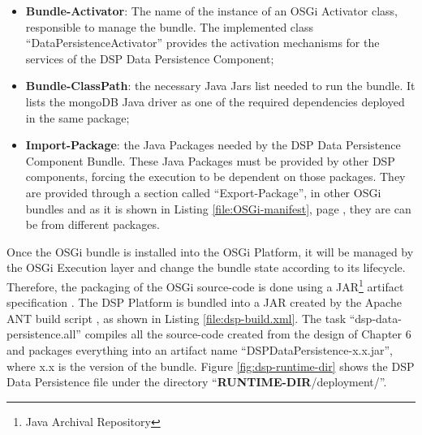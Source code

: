 \begin{itemize}
  \item \textbf{Bundle-Activator}: The name of the instance of an OSGi
  Activator class, responsible to manage the bundle. The implemented class
  ``DataPersistenceActivator'' provides the activation mechanisms for the
  services of the DSP Data Persistence Component;
  \item \textbf{Bundle-ClassPath}: the necessary Java Jars list needed to run
  the bundle. It lists the mongoDB Java driver as one of the required
  dependencies deployed in the same package;
  \item \textbf{Import-Package}: the Java Packages needed by the DSP Data
  Persistence Component Bundle. These Java Packages must be provided by other
  DSP components, forcing the execution to be dependent on those packages.
  They are provided through a section called ``Export-Package'', in other
  OSGi bundles and as it is shown in Listing \ref{file:OSGi-manifest}, page
  \pageref{file:OSGi-manifest}, they are can be from different packages.
\end{itemize}

Once the OSGi bundle is installed into the OSGi Platform, it will be managed by
the OSGi Execution layer and change the bundle state according to its
lifecycle. Therefore, the packaging of the OSGi source-code is done using a
JAR\footnote{Java Archival Repository} artifact specification
\cite{java-tutorial}. The DSP Platform is bundled into a JAR created by the
Apache ANT build script \cite{apache-ant}, as shown in Listing
\ref{file:dsp-build.xml}. The task ``dsp-data-persistence.all'' compiles all
the source-code created from the design of Chapter 6 and packages
everything into an artifact name ``DSPDataPersistence-x.x.jar'', where x.x is
the version of the bundle. Figure \ref{fig:dsp-runtime-dir} shows the DSP Data
Persistence file under the directory ``\textbf{RUNTIME-DIR}/deployment/''.

